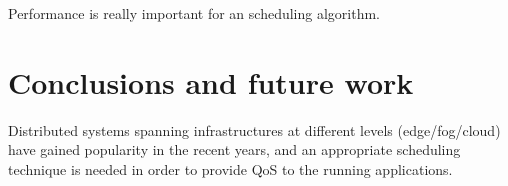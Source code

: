\documentclass[conference]{IEEEtran}
\begin{document}
Performance is really important for an scheduling algorithm.


\section{Conclusions and future work}\label{sec:conc}

Distributed systems spanning infrastructures at different levels (edge/fog/cloud) have gained popularity in the recent years, and an appropriate scheduling technique is needed in order to provide QoS to the running applications. 






% 

\end{document}
